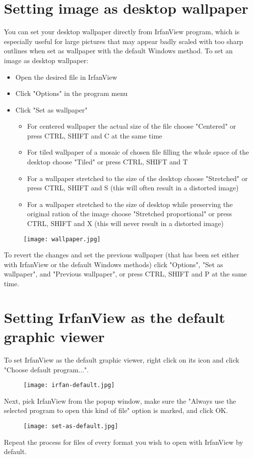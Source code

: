 \documentclass[
	fontsize=10pt, 
	twoside=true, 
	numbers=noenddot, 
]{kaobook}
\begin{document}
\section{Setting image as desktop wallpaper}
You can set your desktop wallpaper directly from IrfanView program, which is especially useful for large pictures that may appear badly scaled with too sharp outlines when set as wallpaper with the default Windows method.
To set an image as desktop wallpaper:
\begin{itemize}
    \item Open the desired file in IrfanView
    \item Click "Options" in the program menu
    \item Click "Set as wallpaper"\begin{itemize}
        \item For centered wallpaper the actual size of the file choose "Centered" or press CTRL, SHIFT and C at the same time
        \item For tiled wallpaper of a mosaic of chosen file filling the  whole space of the desktop choose "Tiled" or press CTRL, SHIFT and T
        \item For a wallpaper stretched to the size of the desktop choose "Stretched" or press CTRL, SHIFT and S (this will often result in a distorted image)
        \item For a wallpaper stretched to the size of  desktop while preserving the original ration of the image choose "Stretched proportional" or press CTRL, SHIFT and X (this will never result in a distorted image)
    \end{itemize}
\end{itemize}
\begin{figure}[h]
    \centering
    \texttt{[image: wallpaper.jpg]}
\end{figure}
\par To revert the changes and set the previous wallpaper (that has been set either with IrfanView or the default Windows methods) click "Options", "Set as wallpaper", and "Previous wallpaper", or press CTRL, SHIFT and P at the same time.

\section{Setting IrfanView as the default graphic viewer}
\par To set IrfanView as the default graphic viewer, right click on its icon and click "Choose default program...".
\begin{figure}[h]
    \centering
    \texttt{[image: irfan-default.jpg]}
\end{figure}
\par Next, pick IrfanView from the popup window, make sure the "Always use the selected program to open this kind of file" option is marked, and click OK.
\begin{figure}[h!]
    \centering
    \texttt{[image: set-as-default.jpg]}
\end{figure}
\par Repeat the process for files of every format you wish to open with IrfanView by default.
\end{document}
